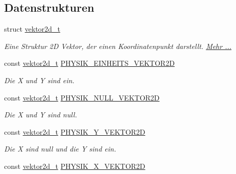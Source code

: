 \subsection*{Datenstrukturen}
\begin{DoxyCompactItemize}
\item 
struct \hyperlink{group__VEKTOR2D_structvektor2d__t}{vektor2d\+\_\+t}
\begin{DoxyCompactList}\small\item\em Eine Struktur 2D Vektor, der einen Koordinatenpunkt darstellt.  \hyperlink{group__VEKTOR2D_structvektor2d__t}{Mehr ...}\end{DoxyCompactList}\end{DoxyCompactItemize}
\begin{DoxyCompactItemize}
\item 
const \hyperlink{group__VEKTOR2D_structvektor2d__t}{vektor2d\+\_\+t} \hyperlink{group__VEKTOR2D_ga5261c4da7b847a8d2d91efd4cb9d0d17}{P\+H\+Y\+S\+I\+K\+\_\+\+E\+I\+N\+H\+E\+I\+T\+S\+\_\+\+V\+E\+K\+T\+O\+R2D}\hypertarget{group__VEKTOR2D_ga5261c4da7b847a8d2d91efd4cb9d0d17}{}\label{group__VEKTOR2D_ga5261c4da7b847a8d2d91efd4cb9d0d17}

\begin{DoxyCompactList}\small\item\em Die X und Y sind ein. \end{DoxyCompactList}\item 
const \hyperlink{group__VEKTOR2D_structvektor2d__t}{vektor2d\+\_\+t} \hyperlink{group__VEKTOR2D_ga1df5a950162dfc4005604d1618edee68}{P\+H\+Y\+S\+I\+K\+\_\+\+N\+U\+L\+L\+\_\+\+V\+E\+K\+T\+O\+R2D}\hypertarget{group__VEKTOR2D_ga1df5a950162dfc4005604d1618edee68}{}\label{group__VEKTOR2D_ga1df5a950162dfc4005604d1618edee68}

\begin{DoxyCompactList}\small\item\em Die X und Y sind null. \end{DoxyCompactList}\item 
const \hyperlink{group__VEKTOR2D_structvektor2d__t}{vektor2d\+\_\+t} \hyperlink{group__VEKTOR2D_gab758e3226f37fb0cc91cc382cd8ff4a1}{P\+H\+Y\+S\+I\+K\+\_\+\+Y\+\_\+\+V\+E\+K\+T\+O\+R2D}\hypertarget{group__VEKTOR2D_gab758e3226f37fb0cc91cc382cd8ff4a1}{}\label{group__VEKTOR2D_gab758e3226f37fb0cc91cc382cd8ff4a1}

\begin{DoxyCompactList}\small\item\em Die X sind null und die Y sind ein. \end{DoxyCompactList}\item 
const \hyperlink{group__VEKTOR2D_structvektor2d__t}{vektor2d\+\_\+t} \hyperlink{group__VEKTOR2D_gacc85ed6be7546dd40efbe1959419feed}{P\+H\+Y\+S\+I\+K\+\_\+\+X\+\_\+\+V\+E\+K\+T\+O\+R2D}\hypertarget{group__VEKTOR2D_gacc85ed6be7546dd40efbe1959419feed}{}\label{group__VEKTOR2D_gacc85ed6be7546dd40efbe1959419feed}


\end{DoxyCompactItemize}

